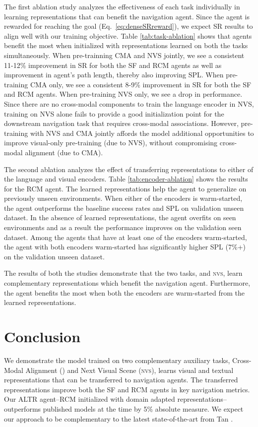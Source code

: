 \documentclass[10pt,twocolumn,letterpaper]{article}
\newcommand{\tasknvs}{\textsc{nvs}}
\begin{document}
The first ablation study analyzes the effectiveness of each task individually in learning representations that can benefit the navigation agent. Since the agent is rewarded for reaching the goal (Eq.~\ref{eq:denseSRreward}), we expect SR results to align well with our training objective. Table \ref{tab:task-ablation} shows that agents benefit the most when initialized with representations learned on both the tasks simultaneously. When pre-trainning CMA and NVS jointly, we see a consistent 11-12\% improvement in SR for both the SF and RCM agents as well as improvement in agent's path length, thereby also improving SPL. When pre-training CMA only, we see a consistent 8-9\% improvement in SR for both the SF and RCM agents. When pre-training NVS only, we see a drop in performance. Since there are no cross-modal components to train the language encoder in NVS, training on NVS alone fails to provide a good initialization point for the downstream navigation task that requires cross-modal associations. However, pre-training with NVS and CMA jointly affords the model additional opportunities to improve visual-only pre-training (due to NVS), without compromising cross-modal alignment (due to CMA).

The second ablation analyzes the effect of transferring representations to either of the language and visual encoders. Table \ref{tab:encoder-ablation} shows the results for the RCM agent. The learned representations help the agent to generalize on previously unseen environments. When either of the encoders is warm-started, the agent outperforms the baseline success rates and SPL on validation unseen dataset. In the absence of learned representations, the agent overfits on seen environments and as a result the performance improves on the validation seen dataset. Among the agents that have at least one of the encoders warm-started, the agent with both encoders warm-started has significantly higher SPL (7\%+) on the validation unseen dataset.

The results of both the studies demonstrate that the two tasks, {\taskcma} and {\tasknvs}, learn complementary representations which benefit the navigation agent. Furthermore, the agent benefits the most when both the encoders are warm-started from the learned representations. 
\section{Conclusion}
\label{sec:conclusion}

We demonstrate the model trained on two complementary auxiliary tasks, Cross-Modal Alignment ({\taskcma}) and Next Visual Scene ({\tasknvs}), learns visual and textual representations that can be transferred to navigation agents. The transferred representations improve both the SF and RCM agents in key navigation metrics. Our ALTR agent--RCM initialized with domain adapted representations--outperforms published models at the time by 5\% absolute measure. We expect our approach to be complementary to the latest state-of-the-art from Tan \etal \cite{Tan:2019:EnvironmentalDropout}.
\end{document}
